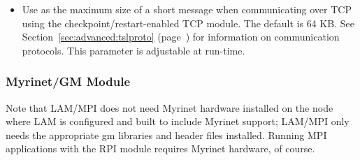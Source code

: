 
\begin{itemize}

\item {}
  
  Use  as the maximum size of a short message when
  communicating over TCP using the checkpoint/restart-enabled TCP
  module.  The default is 64 KB.  See
  Section~\ref{sec:advanced:tslproto}
  (page~\pageref{sec:advanced:tslproto}) for information on
  communication protocols.  This parameter is adjustable at run-time.

\end{itemize}



\subsubsection{Myrinet/GM  Module}
\label{sec:configure:ssi:options:gm}

Note that LAM/MPI does not need Myrinet hardware installed on the node
where LAM is configured and built to include Myrinet support; LAM/MPI
only needs the appropriate gm libraries and header files installed.
Running MPI applications with the  RPI module requires Myrinet
hardware, of course.


